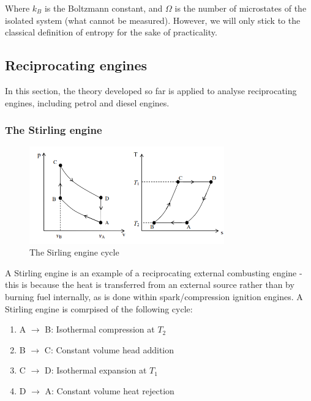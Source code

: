 \documentclass{article}
\begin{document}
Where $k_B$ is the Boltzmann constant, and $\Omega$ is the number of microstates of the isolated system (what cannot be measured). However, we will only stick to the classical definition of entropy for the sake of practicality.

\newpage

\subsection{Reciprocating engines}

In this section, the theory developed so far is applied to analyse reciprocating engines, including petrol and diesel engines.

\subsubsection{The Stirling engine}

\begin{figure}[h]
    \centering
    \includegraphics[width = 0.75\textwidth]{images/Screenshot 2024-04-03 165400.png}
    \caption{The Sirling engine cycle}
    \label{fig:enter-label}
\end{figure}

A Stirling engine is an example of a reciprocating external combusting engine - this is because the heat is transferred from an external source rather than by burning fuel internally, as is done within spark/compression ignition engines. A Stirling engine is comrpised of the following cycle:

\begin{enumerate}
    \item A $\to$ B: Isothermal compression at $T_2$
    \item B $\to$ C: Constant volume head addition
    \item C $\to$ D: Isothermal expansion at $T_1$
    \item D $\to$ A: Constant volume heat rejection
\end{enumerate}
\end{document}
